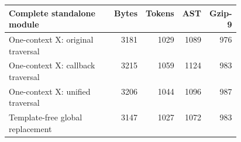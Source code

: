 \begin{tabular}{@{}p{0.46\linewidth}rrrr@{}}
\toprule
Complete standalone module & Bytes & Tokens & AST & Gzip-9\\
\midrule
One-context X: original traversal & 3181 & 1029 & 1089 & 976\\
One-context X: callback traversal & 3215 & 1059 & 1124 & 983\\
One-context X: unified traversal & 3206 & 1044 & 1096 & 987\\
Template-free global replacement & 3147 & 1027 & 1072 & 983\\
\bottomrule
\end{tabular}
